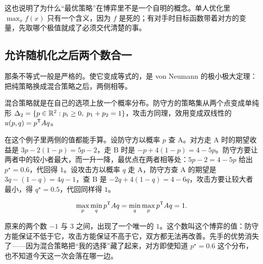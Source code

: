 这也说明了为什么``最优策略''在博弈里不是一个自明的概念。单人优化里 \(\max_x f(x)\) 只有一个含义，因为 \(f\) 是死的；有对手时目标函数带着对方的变量，先取哪个极值就成了必须交代清楚的事。

\subsection{允许随机化之后两个数合一}

那条不等式一般是严格的。使它变成等式的，是 von Neumann 的极小极大定理：把纯策略换成混合策略之后，两侧相等。

混合策略就是在自己的选项上放一个概率分布。防守方的策略集从两个点变成单纯形 \(\Delta_2=\{p\in\mathbb{R}^2:p_i\ge0,\;p_1+p_2=1\}\)，攻击方同理，效用变成双线性的 \(u(p,q)=p^{\mathsf{T}}Aq\)。

在这个例子里两侧的值都能手算。设防守方以概率 \(p\) 查 A。对方走 A 时的期望收益是 \(3p-2(1-p)=5p-2\)，走 B 时是 \(-p+4(1-p)=4-5p\)。防守方要让两者中的较小者最大，而一升一降，最优点在两者相等处：\(5p-2=4-5p\) 给出 \(p^\star=0.6\)，代回得 \(1\)。设攻击方以概率 \(q\) 走 A，防守方查 A 的期望是 \(3q-(1-q)=4q-1\)，查 B 是 \(-2q+4(1-q)=4-6q\)，攻击方要让较大者最小，得 \(q^\star=0.5\)，代回同样得 \(1\)。

\[
\max_{p}\min_{q}p^{\mathsf{T}}Aq=\min_{q}\max_{p}p^{\mathsf{T}}Aq=1 .
\]

原来的两个数 \(-1\) 与 \(3\) 之间，出现了一个唯一的 \(1\)。这个数叫这个博弈的值：防守方能保证不低于它，攻击方能保证不高于它，双方都无法再改善。先手的优势消失了——因为混合策略把``我的选择''藏了起来，对方即使知道 \(p^\star=0.6\) 这个分布，也不知道今天这一次会落在哪一边。

